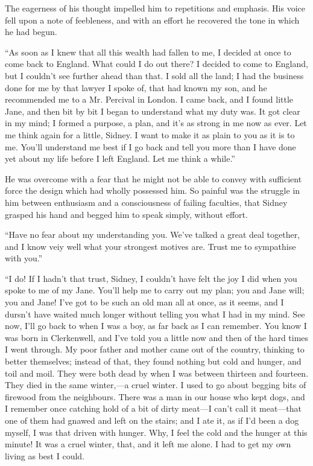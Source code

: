 The eagerness of his thought impelled him to repetitions and emphasis.
His voice fell upon a note of feebleness, and with an effort he
recovered the tone in which he had begun.

``As soon as I knew that all this wealth had fallen to me, I decided at
once to come back to England. What could I do out
{\protect\hypertarget{129}{}{}}there? I decided to come to England, but
I couldn't see further ahead than that. I sold all the land; I had the
business done for me by that lawyer I spoke of, that had known my son,
and he recommended me to a Mr. Percival in London. I came back, and I
found little Jane, and then bit by bit I began to understand what my
duty was. It got clear in my mind; I formed a purpose, a plan, and it's
as strong in me now as ever. Let me think again for a little, Sidney. I
want to make it as plain to you as it is to me. You'll understand me
best if I go back and tell you more than I have done yet about my life
before I left England. Let me think a while.''

He was overcome with a fear that he might not be able to convey with
sufficient force the design which had wholly possessed him. So painful
was the struggle in him between enthusiasm and a consciousness of
failing faculties, that Sidney grasped his hand and begged him to speak
simply, without effort.

{\protect\hypertarget{130}{}{}}``Have no fear about my understanding
you. We've talked a great deal together, and I know veiy well what your
strongest motives are. Trust me to sympathise with you.''

``I do! If I hadn't that trust, Sidney, I couldn't have felt the joy I
did when you spoke to me of my Jane. You'll help me to carry out my
plan; you and Jane will; you and Jane! I've got to be such an old man
all at once, as it seems, and I dursn't have waited much longer without
telling you what I had in my mind. See now, I'll go back to when I was a
boy, as far back as I can remember. You know I was born in Clerkenwell,
and I've told you a little now and then of the hard times I went
through. My poor father and mother came out of the country, thinking to
better themselves; instead of that, they found nothing but cold and
hunger, and toil and moil. They were both dead by when I was between
thirteen and fourteen. They died in the same winter,---a cruel winter. I
used to go about begging bits of firewood from the neighbours.
{\protect\hypertarget{131}{}{}}There was a man in our house who kept
dogs, and I remember once catching hold of a bit of dirty meat---I can't
call it meat---that one of them had gnawed and left on the stairs; and I
ate it, as if I'd been a dog myself, I was that driven with hunger. Why,
I feel the cold and the hunger at this minute! It was a cruel winter,
that, and it left me alone. I had to get my own living as best I could.

